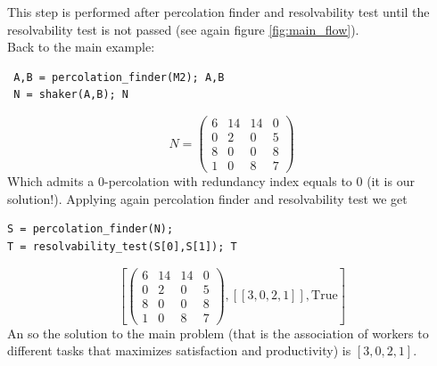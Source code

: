 \documentclass[12pt]{ClasseMatematicamente}
\begin{document}
\noindent
This step is performed after percolation finder and resolvability test until the resolvability test is not passed (see again figure \ref{fig:main_flow}). \\
Back to the main example:
\begin{small}
 \begin{verbatim}
 A,B = percolation_finder(M2); A,B
 N = shaker(A,B); N
\end{verbatim}
\end{small}
\begin{equation}\label{matrix_M5}
N=
\left(\begin{array}{rrrr}
6 & 14 & 14 & 0 \\
0 & 2 & 0 & 5 \\
8 & 0 & 0 & 8 \\
1 & 0 & 8 & 7
\end{array}\right)
\end{equation}
Which admits a $0$-percolation with redundancy index equals to $0$ (it is our solution!). Applying again percolation finder and resolvability test we get
\begin{small}
 \begin{verbatim}
S = percolation_finder(N);
T = resolvability_test(S[0],S[1]); T
\end{verbatim}
\end{small}
\begin{equation}
\left[\left(\begin{array}{rrrr}
6 & 14 & 14 & 0 \\
0 & 2 & 0 & 5 \\
8 & 0 & 0 & 8 \\
1 & 0 & 8 & 7
\end{array}\right), \left[\left[3, 0, 2, 1\right]\right],
\mathrm{True}\right]
\end{equation}
An so the solution to the main problem (that is the association of workers to different tasks that maximizes satisfaction and productivity) is $[3, 0, 2, 1]$.

\end{document}
